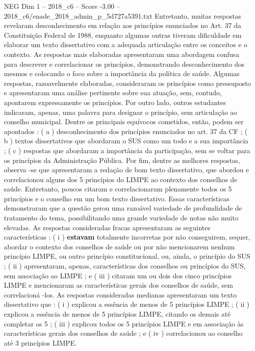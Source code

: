 \begin{textsample}{NEG Dim 1 – 2018\_c6 – Score -3.00 – 2018\_c6/enade\_2018\_admin\_p\_5d727a5391.txt}
Entretanto, muitas respostas revelaram desconhecimento em relação aos princípios enunciados no Art. 37 da Constituição Federal de 1988, enquanto algumas outras tiveram dificuldade em elaborar um texto dissertativo com a adequada articulação entre os conceitos e o contexto.
As respostas mais elaboradas apresentaram uma abordagem confusa para descrever e correlacionar os princípios, demonstrando desconhecimento dos mesmos e colocando o foco sobre a importância da política de saúde.
Algumas respostas, razoavelmente elaboradas, consideraram os princípios como pressuposto e apresentaram uma análise pertinente sobre sua atuação, sem, contudo, apontarem expressamente os princípios.
Por outro lado, outros estudantes indicaram, apenas, uma palavra para designar o princípio, sem articulação ao conselho municipal.
Dentre os principais equívocos cometidos, então, podem ser apontados : ( a ) desconhecimento dos princípios enunciados no art. 37 da CF ; ( b ) textos dissertativos que abordaram o SUS como um todo e a sua importância ; ( c ) respostas que abordaram a importância da participação, sem se voltar para os princípios da Administração Pública.
Por fim, dentre as melhores respostas, observa -se que apresentaram a redação de bom texto dissertativo, que abordou e correlacionou alguns dos 5 princípios do LIMPE ao contexto dos conselhos de saúde.
Entretanto, poucos citaram e correlacionaram plenamente todos os 5 princípios e o conselho em um bom texto dissertativo.
Essas características demonstraram que a questão gerou uma razoável variedade de profundidade de tratamento do tema, possibilitando uma grande variedade de notas não muito elevadas.
As respostas consideradas fracas apresentaram as seguintes características : ( i ) \textbf{estavam} totalmente incorretas por não conseguirem, sequer, abordar o contexto dos conselhos de saúde ou por não mencionarem nenhum princípio LIMPE, ou outro princípio constitucional, ou, ainda, o princípio do SUS ; ( ii ) apresentaram, apenas, características dos conselhos ou princípios do SUS, sem associação ao LIMPE ; e ( iii ) citaram um ou dois dos cinco princípios LIMPE e mencionaram as características gerais dos conselhos de saúde, sem correlacioná -los.
As respostas consideradas medianas apresentaram um texto dissertativo que : ( i ) explicou a essência de menos de 5 princípios LIMPE ; ( ii ) explicou a essência de menos de 5 princípios LIMPE, citando os demais até completar os 5 ; ( iii ) explicou todos os 5 princípios LIMPE e em associação às características gerais dos conselhos de saúde ; e ( iv ) correlacionou ao conselho até 3 princípios LIMPE.

\end{textsample}
